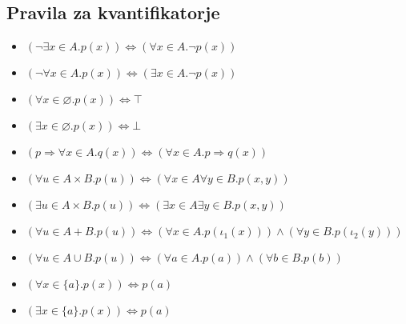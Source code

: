 \subsection{Pravila za kvantifikatorje}
\begin{itemize}
	\item $(\lnot \exists x \in A. p(x)) \iff (\forall x \in A . \lnot p(x))$
	\item $(\lnot \forall x \in A . p(x)) \iff (\exists x \in A . \lnot p(x))$
	\item $(\forall x \in \varnothing . p(x)) \iff \top$
	\item $(\exists x \in \varnothing . p(x)) \iff \bot$
	\item $(p \Rightarrow \forall x \in A . q(x)) \iff (\forall x \in A . p \Rightarrow q(x))$
	\item $(\forall u \in A \times B . p(u)) \iff (\forall x \in A \forall y \in B . p(x, y))$
	\item $(\exists u \in A \times B . p(u)) \iff (\exists x \in A \exists y \in B . p(x, y))$
	\item $(\forall u \in A + B . p(u)) \iff (\forall x \in A . p(\iota_1(x))) \land (\forall y \in B . p (\iota_2(y)))$
	\item $(\forall u \in A \cup B . p(u)) \iff (\forall a \in A. p(a)) \land (\forall b \in B . p(b))$
	\item $(\forall x \in \{a\} . p(x)) \iff p(a)$
	\item $(\exists x \in \{a\} . p(x)) \iff p(a)$
\end{itemize}